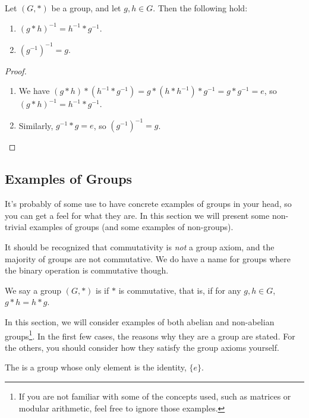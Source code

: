 \documentclass[a4]{scrreprt}
\begin{document}
\begin{proposition}
	Let $(G, *)$ be a group, and let $g, h \in G$. Then the following hold:
	\begin{enumerate}[label=(\roman*)]
		\item $(g*h)^{-1} = h^{-1} * g^{-1}$.
		\item $(g^{-1})^{-1} = g$.
	\end{enumerate}
\end{proposition}
\begin{proof}$ $\phantom{\qedhere}
	\begin{enumerate}[label=(\roman*)]
		\item We have $(g*h) * (h^{-1} * g^{-1}) =  g * (h * h^{-1}) * g^{-1} = g * g^{-1} = e$, so $(g*h)^{-1} = h^{-1} * g^{-1}$.
		\item Similarly, $g^{-1} * g = e$, so $(g^{-1})^{-1} = g$. \hfill \qedsymbol
	\end{enumerate}
\end{proof}

\subsection{Examples of Groups}

It's probably of some use to have concrete examples of groups in your head, so you can get a feel for what they are. In this section we will present some non-trivial examples of groups (and some examples of non-groups).

It should be recognized that commutativity is \emph{not} a group axiom, and the majority of groups are not commutative. We do have a name for groups where the binary operation is commutative though.

\begin{definition}
	We say a group $(G, *)$ is  if $*$ is commutative, that is, if for any $g, h \in G$, $g * h = h * g$.
\end{definition}

In this section, we will consider examples of both abelian and non-abelian groups\footnote{If you are not familiar with some of the concepts used, such as matrices or modular arithmetic, feel free to ignore those examples.}. In the first few cases, the reasons why they are a group are stated. For the others, you should consider how they satisfy the group axioms yourself. 

\begin{example}
	The  is a group whose only element is the identity, $\{ e \}$.
\end{example}
\end{document}
